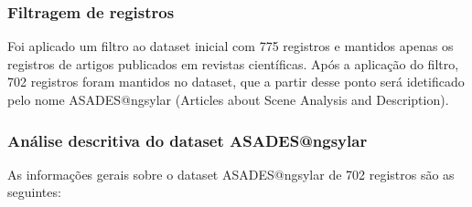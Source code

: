 \subsubsection{Filtragem de registros}

Foi aplicado um filtro ao dataset inicial com 775 registros e mantidos apenas os registros de artigos publicados em revistas científicas. Após a aplicação do filtro, 702 registros foram mantidos no dataset, que a partir desse ponto será idetificado pelo nome ASADES@ngsylar (Articles about Scene Analysis and Description).

\subsubsection{Análise descritiva do dataset ASADES@ngsylar}

As informações gerais sobre o dataset ASADES@ngsylar de 702 registros são as seguintes:

